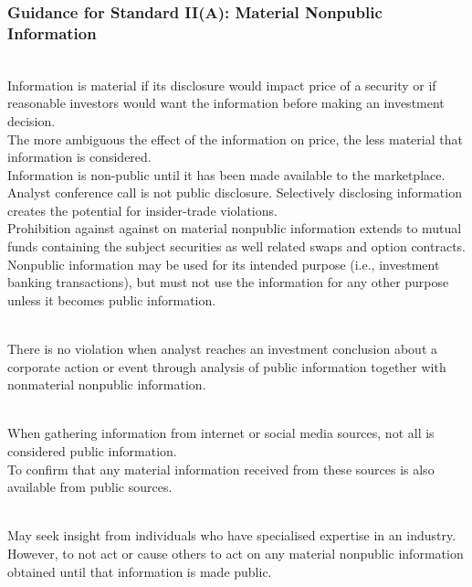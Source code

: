 \subsubsection{Guidance for Standard II(A): Material Nonpublic Information}

\begin{remark} \\
Information is material if its disclosure would impact price of a security or if reasonable investors would want the information before making an investment decision.\\
The more ambiguous the effect of the information on price, the less material that information is considered.\\
Information is non-public until it has been made available to the marketplace. Analyst conference call is not public disclosure. Selectively disclosing information creates the potential for insider-trade violations.\\
Prohibition against against on material nonpublic information extends to mutual funds containing the subject securities as well related swaps and option contracts.\\
Nonpublic information may be used for its intended purpose (i.e., investment banking transactions), but must not use the information for any other purpose unless it becomes public information.
\end{remark}

\begin{remark} \\
There is no violation when analyst reaches an investment conclusion about a corporate action or event through analysis of public information together with nonmaterial nonpublic information.
\end{remark}

\begin{remark} \\
When gathering information from internet or social media sources, not all is considered public information.\\
To confirm that any material information received from these sources is also available from public sources.
\end{remark}

\begin{remark} \\
May seek insight from individuals who have specialised expertise in an industry. However, to not act or cause others to act on any material nonpublic information obtained until that information is made public.
\end{remark}

